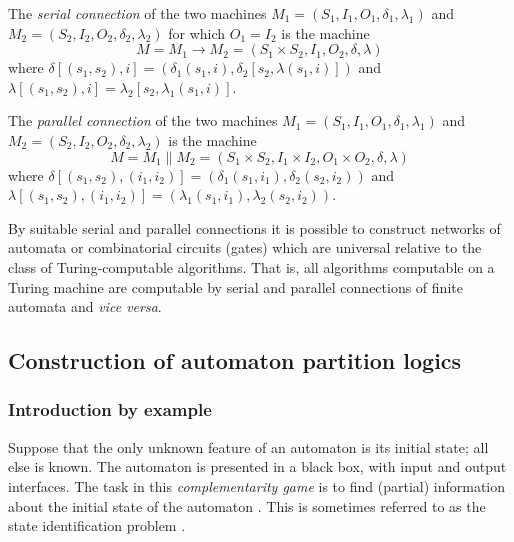 The {\em serial connection} of the two machines
$M_1=(S_1,I_1,O_1,\delta_1,\lambda_1)$
and
$M_2=(S_2,I_2,O_2,\delta_2,\lambda_2)$
for which $O_1=I_2$
is the machine \cite[p. 42]{hartmanis}
$$M=M_1 \rightarrow M_2 = (S_1\times S_2, I_1, O_2,\delta ,\lambda )$$
where
$\delta [(s_1,s_2),i]=\left( \delta_1(s_1,i),\delta_2[s_2,\lambda
(s_1,i)]\right)$ and
$\lambda [(s_1,s_2),i]=\lambda_2[s_2,\lambda_1(s_1,i)]$.

The {\em parallel
 connection} of the two machines
$M_1=(S_1,I_1,O_1,\delta_1,\lambda_1)$
and
$M_2=(S_2,I_2,O_2,\delta_2,\lambda_2)$
is the machine \cite[p. 48]{hartmanis}
$$M=M_1 \| M_2 = (S_1\times S_2, I_1\times I_2,O_1\times O_2,\delta
,\lambda )$$
where
$\delta [(s_1,s_2),(i_1,i_2)]=(\delta_1(s_1,i_1),\delta_2(s_2,i_2))$
and
$\lambda [(s_1,s_2),(i_1,i_2)]=(\lambda_1(s_1,i_1),\lambda_2(s_2,i_2))$.



By suitable serial and parallel connections it is  possible to
construct networks of automata or
combinatorial circuits (gates) which are universal relative to the class
of Turing-computable algorithms.
That is, all algorithms computable on a Turing machine are computable by
serial and parallel connections of finite automata and {\it vice versa}.



\subsection{Construction of automaton partition logics}



\subsubsection*{Introduction by example}

Suppose that the only unknown feature of an automaton is its initial
state; all else is known. The automaton is presented in a black box,
with input and output interfaces. The task in this {\em complementarity
game} is to find (partial) information about the initial state of the
automaton \cite{e-f-moore}.
This is sometimes referred to as the state identification problem
\cite{conway,brauer-84}.


